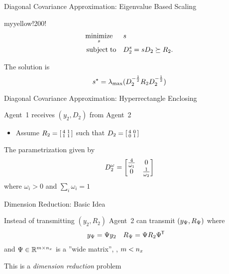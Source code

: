 \documentclass[aspectratio=1610]{beamer}
\begin{document}
\begin{frame}{Diagonal Covariance Approximation: Eigenvalue Based Scaling}

\begin{rfshadedcolorbox}[title={Eigenvalue Based Scaling}]{myyellow!200!}
    \begin{equation*}
    \begin{aligned}
    	& \underset{s}{\minimize} & & s \\
    	& \subjectto & & \Ds_2 = sD_2 \succeq R_2.
    \end{aligned}
    \end{equation*}
\end{rfshadedcolorbox}

\vspace{1em}

The solution is
\[
    s^\star=\lambdamax(D_2\invsqrt R_2D_2\invsqrt)
\]

\end{frame}


\begin{frame}{Diagonal Covariance Approximation: Hyperrectangle Enclosing}

Agent~1 receives $(y_2,D_2)$ from Agent~2
\begin{itemize}
    \item Assume $R_2=\BBSM4&1\\1&1\EBSM$ such that $D_2=\BBSM4&0\\0&1\EBSM$
\end{itemize}

\begin{figure}
    \centering
    \begin{tikzpicture}[scale=.85]
        
    \end{tikzpicture}
\end{figure}

The parametrization given by
\begin{equation*}
    D_2^\omega = \BBM \frac{4}{\omega_1}&0 \\ 0&\frac{1}{\omega_2} \EBM
\end{equation*}
where $\omega_i>0$ and $\sum_i\omega_i=1$

\end{frame}


\begin{frame}{Dimension Reduction: Basic Idea}

Instead of transmitting $(y_2,R_2)$ Agent~2 can transmit $(\yM,\RM)$ where
\begin{align*}
    \yM &= \M y_2 &
    \RM &= \M R_2\Mt
\end{align*}
and $\M\in\realsmnx$ is a ''wide matrix'', \ie, $m<\nx$

\vspace{1em}

This is a \emph{dimension reduction} problem

\end{frame}
\end{document}
